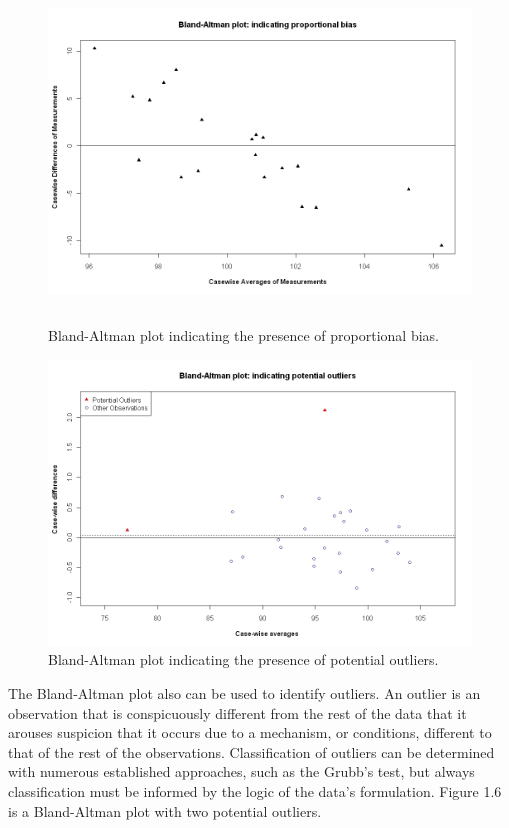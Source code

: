 \documentclass[12pt, a4paper]{report}
\begin{document}
	\begin{figure}[h!]
		\begin{center}
			\includegraphics[height=90mm]{images/PropBias.jpeg}
			\caption{Bland-Altman plot indicating the presence of proportional bias.}\label{PropBias}
		\end{center}
	\end{figure}
	
	\begin{figure}[h!]
		\begin{center}
			\includegraphics[width=125mm]{images/BAOutliers.jpeg}
			\caption{Bland-Altman plot indicating the presence of potential outliers.}\label{Outliers}
		\end{center}
	\end{figure}
	
	
	
	
	The Bland-Altman plot also can be used to identify outliers. An
	outlier is an observation that is conspicuously different from the
	rest of the data that it arouses suspicion that it occurs due to a
	mechanism, or conditions, different to that of the rest of the
	observations. Classification of outliers can be determined with
	numerous established approaches, such as the Grubb's test, but
	always classification must be informed by the logic of the data's
	formulation. Figure 1.6 is a Bland-Altman plot with two potential
	outliers.
	
\end{document}
